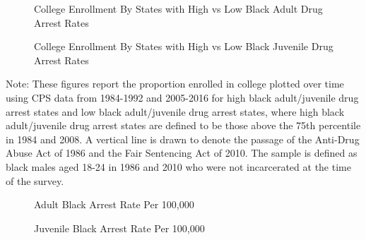 
  \begin{figure}[h]
    \centering
    \caption{College Enrollment By States with High vs Low Black Adult Drug Arrest Rates}%
    \qquad
    \label{fig:raw_college_highlowab_1986}%
  \end{figure}
  \begin{figure}[h]
    \centering
    \caption{College Enrollment By States with High vs Low Black Juvenile Drug Arrest Rates}%
    \qquad
    \label{fig:raw_college_highlowjb_1986}%
  \end{figure}
  
  \begin{footnotesize}
    \noindent Note: These figures report the proportion enrolled in college plotted over time using CPS data from 1984-1992 and 2005-2016 for high black adult/juvenile drug arrest states and low black adult/juvenile drug arrest states, where high black adult/juvenile drug arrest states are defined to be those above the 75th percentile in 1984 and 2008. A vertical line is drawn to denote the passage of the Anti-Drug Abuse Act of 1986 and the Fair Sentencing Act of 2010. The sample is defined as black males aged 18-24 in 1986 and 2010 who were not incarcerated at the time of the survey.
  \end{footnotesize}
  
  \clearpage


  \begin{figure}[h]
    \centering
    \caption{Adult Black Arrest Rate Per 100,000}%
    \qquad
    \label{fig:raw_ab}%
  \end{figure}
  \begin{figure}[h]
    \centering
    \caption{Juvenile Black Arrest Rate Per 100,000}%
    \qquad
    \label{fig:raw_jb}%
  \end{figure}


